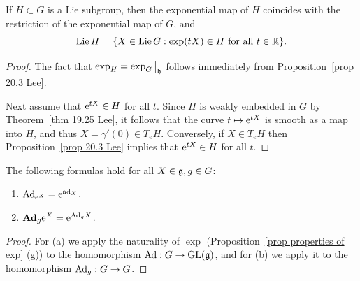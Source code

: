 \begin{prop}\label{prop 20.9 Lee}
    If $H\subset G$ is a Lie subgroup, then the exponential map of $H$ coincides with the restriction of the exponential map of $G$, and 
    \[\operatorname{Lie} H=\{X\in\operatorname{Lie} G: \exp(tX)\in H \text{ for all } t\in \mathbb{R}\}.\]
\end{prop}
\begin{proof}
    The fact that $\exp_H=\restr{\exp_G}{\frakh}$ follows immediately from Proposition~\ref{prop 20.3 Lee}.

    Next assume that $\mathrm{e}^{tX}\in H$ for all $t$. Since $H$ is weakly embedded in $G$ by Theorem~\ref{thm 19.25 Lee}, it follows that the curve $t\mapsto \mathrm{e}^{tX}$ is smooth as a map into $H$, and thus $X=\gamma'(0)\in T_eH$. Conversely, if $X\in T_e H$ then Proposition~\ref{prop 20.3 Lee} implies that $\mathrm{e}^{tX}\in H$ for all $t$.
\end{proof}


\begin{thm}\label{thm 1.5.2 DK}
    The following formulas hold for all $X\in\mathfrak{g},g\in G$:
    \begin{enumerate}[label=(\alph*)]
        \item $\mathrm{Ad}_{\mathrm{e}^X}=\mathrm{e}^{\mathrm{ad}_X}$.
        \item $\mathrm{\mathbf{Ad}}_g \mathrm{e}^X=\mathrm{e}^{\mathrm{Ad}_g X}$.
    \end{enumerate}
\end{thm}
\begin{proof}
    For (a) we apply the naturality of $\exp$ (Proposition~\ref{prop properties of exp} (g)) to the homomorphism $\mathrm{Ad}:G\to \operatorname{GL}(\mathfrak{g})$, and for (b) we apply it to the homomorphism $\mathrm{Ad}_g:G\to G$.
\end{proof}



